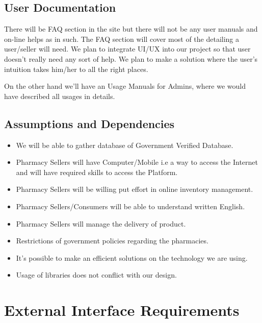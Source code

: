 \documentclass{scrreprt}
\begin{document}
\section{User Documentation}
\item There will be FAQ section in the site but there will not be any user manuals and on-line helps as in such. The FAQ section will cover most of the detailing a user/seller will need. We plan to integrate UI/UX into our project so that user doesn’t really need any sort of help. We plan to make a solution where the user’s intuition takes him/her to all the right places.   \\

\item On the other hand we’ll have an Usage Manuals for Admins, where we would have described all usages in details.   \\

\section{Assumptions and Dependencies}
\begin{itemize}
\item We will be able to gather database of Government Verified Database.
\item Pharmacy Sellers will have Computer/Mobile i.e a way to access the Internet
      and will have required skills to access the Platform.
\item Pharmacy Sellers will be willing put effort in online inventory management.
\item Pharmacy Sellers/Consumers will be able to understand written English.
\item Pharmacy Sellers will manage the delivery of product.
\item Restrictions of government policies regarding the pharmacies.
\item It’s possible to make an efficient solutions on the technology we are using.
\item Usage of libraries does not conflict with our design.
\end{itemize}

\chapter{External Interface Requirements}
\end{document}
